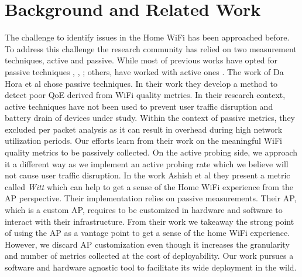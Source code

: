 \section{Background and Related Work}\label{Back_Related_Work}

The challenge to identify issues in the Home WiFi has been approached before. To address this challenge the research community has relied on two measurement techniques, active and passive. While most of previous works have opted for passive techniques \cite{hostview}, \cite{passive_wifi_capacity_estimation}, \cite{observing_through_wifi_APs}; others, have worked with active ones \cite{can_user_level_probing}. The work of Da Hora et al \cite{passive_wifi_capacity_estimation} chose passive techniques. In their work they develop  a method to detect poor QoE derived from WiFi quality metrics. In their research context, active techniques have not been used to prevent user traffic disruption and battery drain of devices under study. Within the context of passive metrics, they excluded per packet analysis as it can result in overhead during high network utilization periods. Our efforts learn from their work on the meaningful WiFi quality metrics to be passively collected. On the active probing side, we approach it a different way as we implement an active probing rate which we believe will not cause user traffic disruption. In the work Ashish et al \cite{observing_through_wifi_APs} they present a metric called \emph{Witt} which can help to get a sense of the Home WiFi experience from the AP perspective. Their implementation relies on passive measurements. Their AP, which is a custom AP, requires to be customized in hardware and software to interact with their infrastructure. From their work we takeaway the strong point of using the AP as a vantage point to get a sense of the home WiFi experience. However, we discard AP customization even though it increases the granularity and number of metrics collected at the cost of deployability. Our work pursues a software and hardware agnostic tool to facilitate its wide deployment in the wild.

